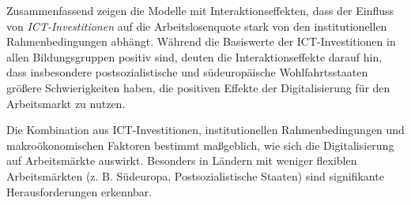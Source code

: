 Zusammenfassend zeigen die Modelle mit Interaktionseffekten, dass der Einfluss von 
\textit{\ac{ICT}-Investitionen} auf die Arbeitslosenquote stark von den institutionellen 
Rahmenbedingungen abhängt. Während die Basiswerte der ICT-Investitionen in allen 
Bildungsgruppen positiv sind, deuten die Interaktionseffekte darauf hin, dass insbesondere 
postsozialistische und südeuropäische Wohlfahrtsstaaten größere Schwierigkeiten haben, 
die positiven Effekte der Digitalisierung für den Arbeitsmarkt zu nutzen. 

Die Kombination aus ICT-Investitionen, institutionellen Rahmenbedingungen und 
makroökonomischen Faktoren bestimmt maßgeblich, wie sich die Digitalisierung auf 
Arbeitsmärkte auswirkt. Besonders in Ländern mit weniger flexiblen Arbeitsmärkten 
(z. B. Südeuropa, Postsozialistische Staaten) sind signifikante Herausforderungen erkennbar.
